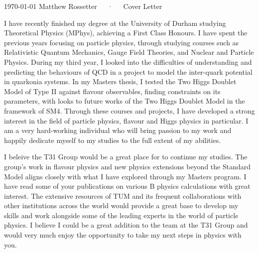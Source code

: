 \documentclass[11pt, a4paper]{awesome-cv}
\newcommand\research{The T31 Group }
\begin{document}
\makecvheader[R]

\makecvfooter
  {\today}
  {Matthew Rossetter~~~·~~~Cover Letter}
  {}

\vspace{-20pt}
\makelettertitle

\begin{cvletter}

I have recently finished my degree at the University of Durham studying Theoretical Physics (MPhys), achieving a First Class Honours.
I have spent the previous years focusing on particle physics, through studying courses such as Relativistic Quantum Mechanics, Gauge Field Theories, and Nuclear and Particle Physics. 
During my third year, I looked into the difficulties of understanding and predicting the behaviours of QCD in a project to model the inter-quark potential in quarkonia systems.
In my Masters thesis, I tested the Two Higgs Doublet Model of Type II against flavour observables, finding constraints on its parameters, with looks to future works of the Two Higgs Doublet Model in the framework of SM4. 
Through these courses and projects, I have developed a strong interest in the field of particle physics, flavour and Higgs physics in particular. 
I am a very hard-working individual who will bring passion to my work and happily dedicate myself to my studies to the full extent of my abilities. 


\lettersection{Why \research?}
I beleive the T31 Group would be a great place for to continue my studies. 
The group's work in flavour physics and new physics extensions beyond the Standard Model aligns closely with what I have explored through my Masters program. 
I have read some of your publications on various B physics calculations with great interest.
The extensive resources of TUM and its frequent collaborations with other institutions across the world would provide a great base to develop my skills and work alongside some of the leading experts in the world of particle physics. 
I believe I could be a great addition to the team at the T31 Group and would very much enjoy the opportunity to take my next steps in physics with you. 


\end{cvletter}
\end{document}
